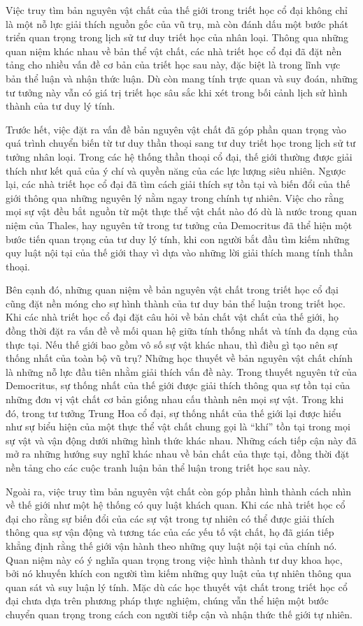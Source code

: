 \documentclass[14pt,a4paper]{extarticle}
\begin{document}
Việc truy tìm bản nguyên vật chất của thế giới trong triết học cổ đại không chỉ là một nỗ lực giải thích nguồn gốc của vũ trụ, mà còn đánh dấu một bước phát triển quan trọng trong lịch sử tư duy triết học của nhân loại. Thông qua những quan niệm khác nhau về bản thể vật chất, các nhà triết học cổ đại đã đặt nền tảng cho nhiều vấn đề cơ bản của triết học sau này, đặc biệt là trong lĩnh vực bản thể luận và nhận thức luận. Dù còn mang tính trực quan và suy đoán, những tư tưởng này vẫn có giá trị triết học sâu sắc khi xét trong bối cảnh lịch sử hình thành của tư duy lý tính.

Trước hết, việc đặt ra vấn đề bản nguyên vật chất đã góp phần quan trọng vào quá trình chuyển biến từ tư duy thần thoại sang tư duy triết học trong lịch sử tư tưởng nhân loại. Trong các hệ thống thần thoại cổ đại, thế giới thường được giải thích như kết quả của ý chí và quyền năng của các lực lượng siêu nhiên. Ngược lại, các nhà triết học cổ đại đã tìm cách giải thích sự tồn tại và biến đổi của thế giới thông qua những nguyên lý nằm ngay trong chính tự nhiên. Việc cho rằng mọi sự vật đều bắt nguồn từ một thực thể vật chất nào đó dù là nước trong quan niệm của Thales, hay nguyên tử trong tư tưởng của Democritus đã thể hiện một bước tiến quan trọng của tư duy lý tính, khi con người bắt đầu tìm kiếm những quy luật nội tại của thế giới thay vì dựa vào những lời giải thích mang tính thần thoại.

Bên cạnh đó, những quan niệm về bản nguyên vật chất trong triết học cổ đại cũng đặt nền móng cho sự hình thành của tư duy bản thể luận trong triết học. Khi các nhà triết học cổ đại đặt câu hỏi về bản chất vật chất của thế giới, họ đồng thời đặt ra vấn đề về mối quan hệ giữa tính thống nhất và tính đa dạng của thực tại. Nếu thế giới bao gồm vô số sự vật khác nhau, thì điều gì tạo nên sự thống nhất của toàn bộ vũ trụ? Những học thuyết về bản nguyên vật chất chính là những nỗ lực đầu tiên nhằm giải thích vấn đề này. Trong thuyết nguyên tử của Democritus, sự thống nhất của thế giới được giải thích thông qua sự tồn tại của những đơn vị vật chất cơ bản giống nhau cấu thành nên mọi sự vật. Trong khi đó, trong tư tưởng Trung Hoa cổ đại, sự thống nhất của thế giới lại được hiểu như sự biểu hiện của một thực thể vật chất chung gọi là ``khí'' tồn tại trong mọi sự vật và vận động dưới những hình thức khác nhau. Những cách tiếp cận này đã mở ra những hướng suy nghĩ khác nhau về bản chất của thực tại, đồng thời đặt nền tảng cho các cuộc tranh luận bản thể luận trong triết học sau này.

Ngoài ra, việc truy tìm bản nguyên vật chất còn góp phần hình thành cách nhìn về thế giới như một hệ thống có quy luật khách quan. Khi các nhà triết học cổ đại cho rằng sự biến đổi của các sự vật trong tự nhiên có thể được giải thích thông qua sự vận động và tương tác của các yếu tố vật chất, họ đã gián tiếp khẳng định rằng thế giới vận hành theo những quy luật nội tại của chính nó. Quan niệm này có ý nghĩa quan trọng trong việc hình thành tư duy khoa học, bởi nó khuyến khích con người tìm kiếm những quy luật của tự nhiên thông qua quan sát và suy luận lý tính. Mặc dù các học thuyết vật chất trong triết học cổ đại chưa dựa trên phương pháp thực nghiệm, chúng vẫn thể hiện một bước chuyển quan trọng trong cách con người tiếp cận và nhận thức thế giới tự nhiên.
\end{document}
